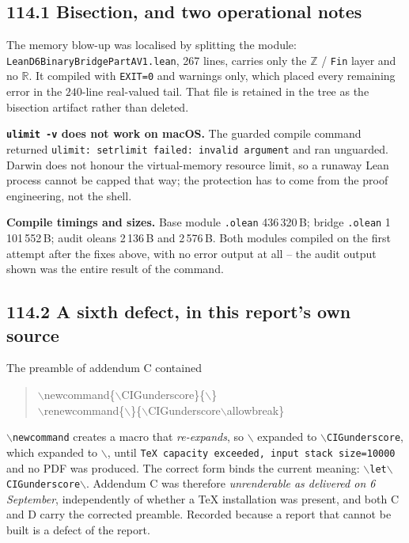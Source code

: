 \documentclass[9pt,twocolumn]{article}
\renewcommand{\_}{\CIGunderscore\allowbreak}
\begin{document}
\subsection*{114.1 Bisection, and two operational notes}
The memory blow-up was localised by splitting the module: \texttt{LeanD6BinaryBridgePart\-AV1.lean}, 267 lines, carries only the $\mathbb{Z}$ / \texttt{Fin} layer and no $\mathbb{R}$. It compiled with \texttt{EXIT=0} and warnings only, which placed every remaining error in the $240$-line real-valued tail. That file is retained in the tree as the bisection artifact rather than deleted.

\textbf{\texttt{ulimit -v} does not work on macOS.} The guarded compile command returned \texttt{ulimit: setrlimit failed: invalid argument} and ran unguarded. Darwin does not honour the virtual-memory resource limit, so a runaway Lean process cannot be capped that way; the protection has to come from the proof engineering, not the shell.

\textbf{Compile timings and sizes.} Base module \texttt{.olean} 436\,320\,B; bridge \texttt{.olean} 1\,101\,552\,B; audit oleans 2\,136\,B and 2\,576\,B. Both modules compiled on the first attempt after the fixes above, with no error output at all -- the audit output shown was the entire result of the command.

\subsection*{114.2 A sixth defect, in this report's own source}
The preamble of addendum C contained
\begin{quote}\ttfamily\scriptsize
$\backslash$newcommand\{$\backslash$CIGunderscore\}\{$\backslash$\_\}\\
$\backslash$renewcommand\{$\backslash$\_\}\{$\backslash$CIGunderscore$\backslash$allowbreak\}
\end{quote}
\texttt{$\backslash$newcommand} creates a macro that \emph{re-expands}, so \texttt{$\backslash$\_} expanded to \texttt{$\backslash$CIGunderscore}, which expanded to \texttt{$\backslash$\_}, until \texttt{TeX capacity exceeded, input stack size=10000} and no PDF was produced. The correct form binds the current meaning: \texttt{$\backslash$let$\backslash$CIGunderscore$\backslash$\_}. Addendum C was therefore \emph{unrenderable as delivered on 6 September}, independently of whether a \TeX{} installation was present, and both C and D carry the corrected preamble. Recorded because a report that cannot be built is a defect of the report.
\end{document}

